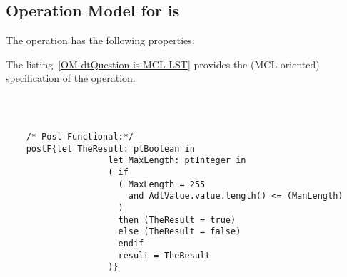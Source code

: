 \subsection{Operation Model for is}

\label{OM-is}


The  operation has the following properties:

	\begin{operationmodel}



		


	\end{operationmodel}



	\vspace{1cm}
	The listing~\ref{OM-dtQuestion-is-MCL-LST} provides the \msrmessir (MCL-oriented) specification of the operation.
	
	\scriptsize
	\vspace{0.5cm}
	\begin{lstlisting}[style=MessirStyle,firstnumber=auto,captionpos=b,caption={\msrmessir (MCL-oriented) specification of the operation \emph{is}.},label=OM-dtQuestion-is-MCL-LST]

	
	
	/* Post Functional:*/ 
	postF{let TheResult: ptBoolean in
			        let MaxLength: ptInteger in
			        ( if
			          ( MaxLength = 255
			            and AdtValue.value.length() <= (ManLength)
			          )
			          then (TheResult = true)
			          else (TheResult = false)
			          endif
			          result = TheResult
			        )}
	
	
	\end{lstlisting}
	\normalsize 
	
	
	
	





